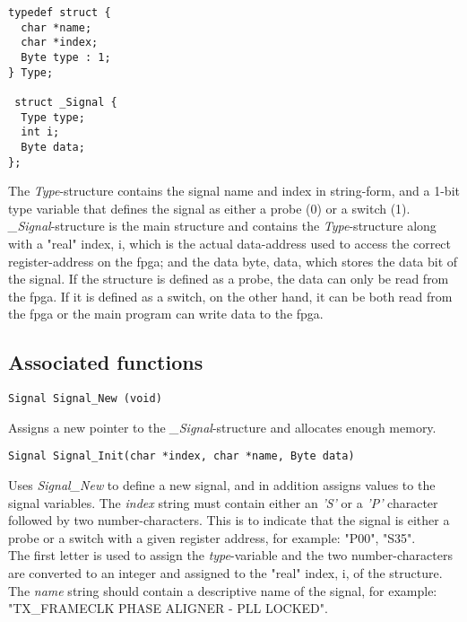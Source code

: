 \documentclass[main.tex]{subfiles}
\begin{document}

\begin{lstlisting}[frame=single] 
typedef struct {
  char *name;
  char *index;
  Byte type : 1;
} Type;

 struct _Signal {
  Type type;
  int i; 
  Byte data; 
};
\end{lstlisting}

The \textit{Type}-structure contains the signal name and index in string-form, and a 1-bit type variable that defines the signal as either a probe (0) or a switch (1). \textit{\_Signal}-structure is the main structure and contains the \textit{Type}-structure along with a "real" index, i, which is the actual data-address used to access the correct register-address on the \gls{fpga}; and the data byte, data, which stores the data bit of the signal. If the structure is defined as a probe, the data can only be read from the \gls{fpga}. If it is defined as a switch, on the other hand, it can be both read from the \gls{fpga} or the main program can write data to the \gls{fpga}.

\subsection{Associated functions}


\begin{lstlisting}[frame=single] 
Signal Signal_New (void)
\end{lstlisting}
Assigns a new pointer to the \textit{\_Signal}-structure and allocates enough memory.\\

\begin{lstlisting}[frame=single] 
Signal Signal_Init(char *index, char *name, Byte data)
\end{lstlisting}
Uses \textit{Signal\_New} to define a new signal, and in addition assigns values to the signal variables. The \textit{index} string must contain either an \textit{'S'} or a \textit{'P'} character followed by two number-characters. This is to indicate that the signal is either a probe or a switch with a given register address, for example: "P00", "S35".\\ 
The first letter is used to assign the \textit{type}-variable and the two number-characters are converted to an integer and assigned to the "real" index, i, of the structure. The \textit{name} string should contain a descriptive name of the signal, for example: "TX\_FRAMECLK PHASE ALIGNER - PLL LOCKED".\\
\end{document}
